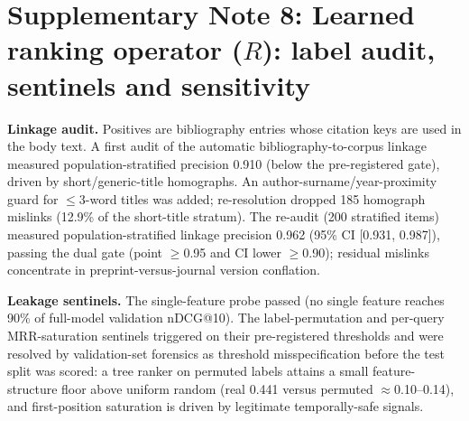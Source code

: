 \documentclass[11pt,a4paper]{article}
\newcommand{\snote}[1]{\section*{Supplementary Note #1}}
\begin{document}
\snote{8: Learned ranking operator ($R$): label audit, sentinels and sensitivity}

\textbf{Linkage audit.} Positives are bibliography entries whose citation keys are used in the body text. A first audit of the automatic bibliography-to-corpus linkage measured population-stratified precision 0.910 (below the pre-registered gate), driven by short/generic-title homographs. An author-surname/year-proximity guard for $\le$3-word titles was added; re-resolution dropped 185 homograph mislinks (12.9\% of the short-title stratum). The re-audit (200 stratified items) measured population-stratified linkage precision 0.962 (95\% CI [0.931, 0.987]), passing the dual gate (point $\ge$0.95 and CI lower $\ge$0.90); residual mislinks concentrate in preprint-versus-journal version conflation.

\textbf{Leakage sentinels.} The single-feature probe passed (no single feature reaches 90\% of full-model validation nDCG@10). The label-permutation and per-query MRR-saturation sentinels triggered on their pre-registered thresholds and were resolved by validation-set forensics as threshold misspecification before the test split was scored: a tree ranker on permuted labels attains a small feature-structure floor above uniform random (real 0.441 versus permuted $\approx$0.10--0.14), and first-position saturation is driven by legitimate temporally-safe signals.

\begin{table}[h]
\caption*{\textbf{Supplementary Table 3.} Held-out ranking results at the top-300 deployment interface (test, $n=153$ reviews; zero-positive queries scored 0).}
\centering
\footnotesize
\setlength{\tabcolsep}{4pt}
\end{table}
\end{document}
